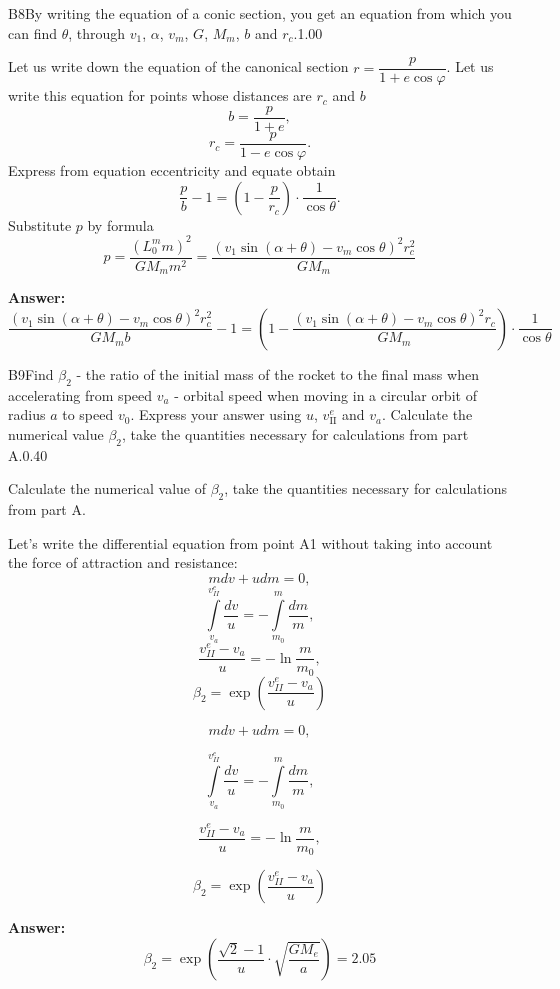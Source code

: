 \documentclass[11pt,a4paper]{article}
\begin{document}
\begin{solcard}{B8}{By writing the equation of a conic section, you get an equation from which you can find $\theta$, through $v_1$, $\alpha$, $v_m$, $G$, $M_m$, $b$ and $r_c$.}{1.00}

Let us write down the equation of the canonical section $r=\dfrac{p}{1+e\cos{\varphi}}$. Let us write this equation for points whose distances are $r_c$ and $b$ $$b=\dfrac{p}{1+e},$$$$r_c=\dfrac{p}{1-e\cos{\varphi}}.$$Express from equation eccentricity and equate obtain $$\dfrac{p}{b}-1=\left(1-\dfrac{p}{r_c}\right)\cdot \dfrac{1}{\cos{\theta}}.$$Substitute $p$ by formula $$p=\dfrac{\left(L_0^m m\right)^2}{GM_m m^2}=\dfrac{\left(v_1\sin(\alpha+\theta)-v_m\cos{\theta}\right)^2 r_c^2}{GM_m}$$

\par\smallskip\noindent\textbf{Answer:} $$\dfrac{\left(v_1\sin(\alpha+\theta)-v_m\cos{\theta}\right)^2 r_c^2}{GM_mb}-1=\left(1-\dfrac{\left(v_1\sin(\alpha+\theta)-v_m\cos{\theta}\right)^2 r_c}{GM_m}\right)\cdot\dfrac{1}{\cos{\theta}}$$
\end{solcard}

\begin{solcard}{B9}{Find $\beta_2$ - the ratio of the initial mass of the rocket to the final mass when accelerating from speed $v_a$ - orbital speed when moving in a circular orbit of radius $a$ to speed $v_0$. Express your answer using $u$, $v_\text{II}^e$ and $v_a$. Calculate the numerical value $\beta_2$, take the quantities necessary for calculations from part A.}{0.40}

Calculate the numerical value of $\beta_2$, take the quantities necessary for calculations from part A.


Let's write the differential equation from point A1 without taking into account the force of attraction and resistance: $$mdv+udm=0,$$ $$\int \limits_{v_a}^{v_{II}^e} \dfrac{dv}{u}=-\int \limits_{m_0}^{m} \dfrac{dm}{m},$$ $$\dfrac{v_{II}^e-v_a}{u}=-\ln{\dfrac{m}{m_0}},$$ $$\beta_2=\exp{\left(\dfrac{v_{II}^e-v_a}{u}\right)}$$


$$mdv+udm=0,$$


$$\int \limits_{v_a}^{v_{II}^e} \dfrac{dv}{u}=-\int \limits_{m_0}^{m} \dfrac{dm}{m},$$


$$\dfrac{v_{II}^e-v_a}{u}=-\ln{\dfrac{m}{m_0}},$$


$$\beta_2=\exp{\left(\dfrac{v_{II}^e-v_a}{u}\right)}$$

\par\smallskip\noindent\textbf{Answer:} $$\beta_2=\exp{\left(\dfrac{\sqrt{2}-1}{u}\cdot\sqrt{\dfrac{GM_e}{a}}\right)}=2.05$$
\end{solcard}
\end{document}
